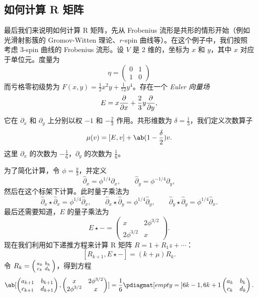 \documentclass{amsart}
\theoremstyle{definition}
\theoremstyle{remark}
\theoremstyle{plain}
\theoremstyle{definition}
\theoremstyle{remark}
\newcommand{\1}{\mathbf{1}}
\newcommand{\2}{\mathbf{2}}
\newcommand{\3}{\mathbf{3}}
\begin{document}
\subsection{如何计算 R 矩阵}%
\label{sub:How to compute the R-matrix}

最后我们来说明如何计算 R 矩阵，先从 Frobenius 流形是共形的情形开始（例如光滑射影簇的 Gromov-Witten 理论、\(r\)-spin 曲线等）。在这个例子中，我们按照~\cite{PPZ2015} 考虑 3-spin 曲线的 Frobenius 流形。设 \(V\) 是 2 维的，坐标为 \(x\) 和 \(y\)，其中 \(x\) 对应于单位元。度量为
\[ \eta = \begin{pmatrix}
    0 & 1 \\
    1 & 0
\end{pmatrix} \]
而亏格零初级势为 \(F(x,y) = \frac{1}{2} x^2 y + \frac{1}{72} y^4\)。存在一个 \textit{Euler 向量场}
\[ E = x \pdv{}{x} + \frac{2}{3} y \pdv{}{y}, \]
它在 \(\partial_x\) 和 \(\partial_y\) 上分别以权 \(-1\) 和 \(-\frac{2}{3}\) 作用。共形维数为 \(\delta = \frac{1}{3}\)，我们定义次数算子
\[ \mu(v) = [E,v] + \ab(1 - \frac{\delta}{2})v. \]
这里 \(\partial_x\) 的次数为 \(-\frac{1}{6}\)，\(\partial_y\) 的次数为 \(\frac{1}{6}\)。

为了简化计算，令 \(\phi = \frac{y}{3}\)，并定义
\[ \hat{\partial}_x = \phi^{1/4} \partial_x, \qquad \hat{\partial}_y = \phi^{-1/4} \partial_y, \]
然后在这个标架下计算。此时量子乘法为
\[ \hat{\partial}_x \star \hat{\partial}_x = \phi^{1/4} \hat{\partial}_x, \qquad \hat{\partial}_x \star \hat{\partial}_y = \phi^{1/4} \hat{\partial}_y, \qquad \hat{\partial}_y \star \hat{\partial}_y = \phi^{1/4} \hat{\partial}_x. \]
最后还需要知道，\(E\) 的量子乘法为
\[ E \star - = \begin{pmatrix}
    x & 2 \phi^{3/2} \\
    2 \phi^{3/2} & x 
\end{pmatrix}. \]
现在我们利用如下递推方程来计算 R 矩阵 \(R = 1 + R_1 z + \cdots\)：
\[ [R_{k+1}, E \star -] = (k + \mu) R_k. \]
令 \(R_k = \begin{psmallmatrix}
    a_k & b_k \\
    c_k & d_k
\end{psmallmatrix}\)，得到方程
\[ \ab[
    \begin{pmatrix}
        a_{k+1} & b_{k+1} \\
        c_{k+1} & d_{k+1}
    \end{pmatrix}, \begin{pmatrix}
        x & 2 \phi^{3/2} \\
        2 \phi^{3/2} & x 
    \end{pmatrix}
] = \frac{1}{6} \pdiagmat[empty={}]{6k-1, 6k+1} \begin{pmatrix}
    a_k & b_k \\
    c_k & d_k 
\end{pmatrix}. \]
\end{document}
